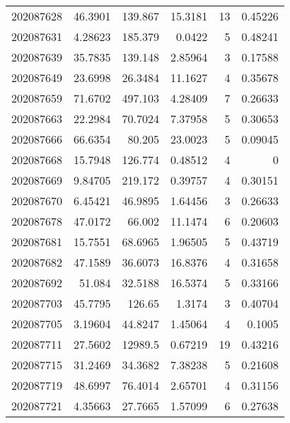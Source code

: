 \begin{tabular}{rrrrrr}
 202087628 &         46.3901  &      139.867  &           15.3181  &          13 & 0.45226 \\
 202087631 &          4.28623 &      185.379  &            0.0422  &           5 & 0.48241 \\
 202087639 &         35.7835  &      139.148  &            2.85964 &           3 & 0.17588 \\
 202087649 &         23.6998  &       26.3484 &           11.1627  &           4 & 0.35678 \\
 202087659 &         71.6702  &      497.103  &            4.28409 &           7 & 0.26633 \\
 202087663 &         22.2984  &       70.7024 &            7.37958 &           5 & 0.30653 \\
 202087666 &         66.6354  &       80.205  &           23.0023  &           5 & 0.09045 \\
 202087668 &         15.7948  &      126.774  &            0.48512 &           4 & 0       \\
 202087669 &          9.84705 &      219.172  &            0.39757 &           4 & 0.30151 \\
 202087670 &          6.45421 &       46.9895 &            1.64456 &           3 & 0.26633 \\
 202087678 &         47.0172  &       66.002  &           11.1474  &           6 & 0.20603 \\
 202087681 &         15.7551  &       68.6965 &            1.96505 &           5 & 0.43719 \\
 202087682 &         47.1589  &       36.6073 &           16.8376  &           4 & 0.31658 \\
 202087692 &         51.084   &       32.5188 &           16.5374  &           5 & 0.33166 \\
 202087703 &         45.7795  &      126.65   &            1.3174  &           3 & 0.40704 \\
 202087705 &          3.19604 &       44.8247 &            1.45064 &           4 & 0.1005  \\
 202087711 &         27.5602  &    12989.5    &            0.67219 &          19 & 0.43216 \\
 202087715 &         31.2469  &       34.3682 &            7.38238 &           5 & 0.21608 \\
 202087719 &         48.6997  &       76.4014 &            2.65701 &           4 & 0.31156 \\
 202087721 &          4.35663 &       27.7665 &            1.57099 &           6 & 0.27638 \\

\end{tabular}
